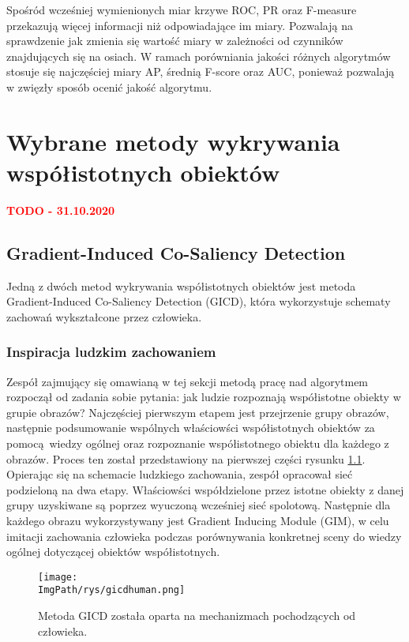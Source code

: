 \documentclass[a4paper,12pt,twoside,openany]{report}
\newcommand{\ImgPath}{.}
\begin{document}
	Spośród wcześniej wymienionych miar krzywe ROC, PR oraz F-measure przekazują więcej informacji niż odpowiadające im miary. Pozwalają na sprawdzenie jak zmienia się wartość miary w zależności od czynników znajdujących się na osiach. W ramach porówniania jakości różnych algorytmów stosuje się najczęściej miary AP, średnią F-score oraz AUC, ponieważ pozwalają w zwięzły sposób ocenić jakość algorytmu. 


\chapter{Wybrane metody wykrywania współistotnych obiektów}
\textcolor{red}{\textbf{TODO - 31.10.2020}}
\section{Gradient-Induced Co-Saliency Detection}

Jedną z dwóch metod wykrywania współistotnych obiektów jest metoda Gradient-Induced Co-Saliency Detection (GICD), która wykorzystuje schematy zachowań wykształcone przez człowieka.

\subsection{Inspiracja ludzkim zachowaniem}
Zespół zajmujący się omawianą w tej sekcji metodą pracę nad algorytmem rozpoczął od zadania sobie pytania: jak ludzie rozpoznają współistotne obiekty w grupie obrazów? Najczęściej pierwszym etapem jest przejrzenie grupy obrazów, następnie podsumowanie wspólnych właściowści współistotnych obiektów za pomocą wiedzy ogólnej oraz rozpoznanie współistotnego obiektu dla każdego z obrazów. Proces ten został przedstawiony na pierwszej części rysunku \ref{GICDhuman}. Opierając się na schemacie ludzkiego zachowania, zespół opracował sieć podzieloną na dwa etapy. Właściowści współdzielone przez istotne obiekty z danej grupy uzyskiwane są poprzez wyuczoną wcześniej sieć spolotową. Następnie dla każdego obrazu wykorzystywany jest Gradient Inducing Module (GIM), w celu imitacji zachowania człowieka podczas porównywania konkretnej sceny do wiedzy ogólnej dotyczącej obiektów współistotnych.

\begin{figure}[h]
	\centering
	\texttt{[image: \\ImgPath/rys/gicdhuman.png]}
	\caption{Metoda GICD została oparta na mechanizmach pochodzących od człowieka.}
	\label{GICDhuman}
\end{figure}
\end{document}
